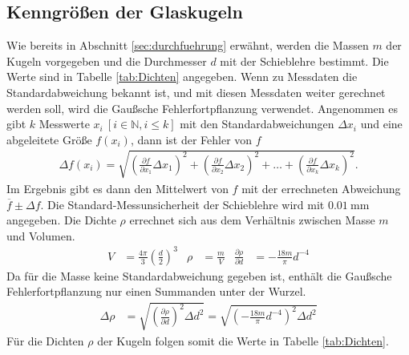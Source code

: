 \subsection{Kenngrößen der Glaskugeln}


Wie bereits in Abschnitt \ref{sec:durchfuehrung} erwähnt, werden die Massen $m$ der Kugeln vorgegeben
und die Durchmesser $d$ mit der Schieblehre bestimmt.
Die Werte sind in Tabelle \ref{tab:Dichten} angegeben.
Wenn zu Messdaten die Standardabweichung bekannt ist, und mit diesen Messdaten weiter gerechnet werden soll,
wird die Gaußsche Fehlerfortpflanzung verwendet. 
Angenommen es gibt $k$ Messwerte $x_i ~[i \in \mathbb{N}, i \leq k]$ mit den Standardabweichungen $\Delta x_i$
und eine abgeleitete Größe $f(x_i)$, dann ist der Fehler von $f$
\begin{align}
    \Delta f(x_i) = \sqrt{
    \left(\frac{\partial f}{\partial x_1} \Delta x_1\right)^2%
     + \left(\frac{\partial f}{\partial x_2} \Delta x_2\right)^2%
     + \dots%
     + \left(\frac{\partial f}{\partial x_k} \Delta x_k\right)^2%
    }.
    \label{eq:gauspflanz}
\end{align} 
Im Ergebnis gibt es dann den Mittelwert von $f$ mit der errechneten Abweichung $\overline{f} \pm \Delta f $.
Die Standard-Messunsicherheit der Schieblehre wird mit $\qty{0.01}{\mm}$ angegeben.
Die Dichte $\rho$ errechnet sich aus dem Verhältnis zwischen Masse $m$ und Volumen.
\begin{align*}
    V &= \frac{4 \pi}{3} \left(\frac{d}{2}\right)^3 & \rho &= \frac{m}{V} &
    \frac{\partial \rho}{\partial d} &= -\frac{18 m}{\pi} d^{-4} %
\end{align*}
%
Da für die Masse keine Standardabweichung gegeben ist, enthält die Gaußsche Fehlerfortpflanzung nur einen Summanden unter der Wurzel.
\begin{align*}
    \Delta \rho &= \sqrt{\left(\frac{\partial \rho}{\partial d} \right)^{2} \Delta d^{2} }%
    =\sqrt{\left(-\frac{18 m}{\pi} d^{-4} \right)^{2} \Delta d^{2} }%
\end{align*}%
Für die Dichten $\rho$ der Kugeln folgen somit die Werte in Tabelle \ref{tab:Dichten}.



